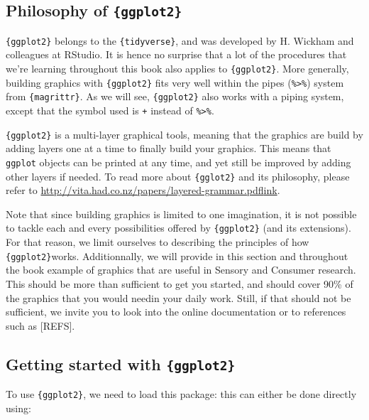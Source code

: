 \documentclass[
]{book}
\begin{document}
\hypertarget{philosophy-of-ggplot2}{%
\subsection{\texorpdfstring{Philosophy of \texttt{\{ggplot2\}}}{Philosophy of \{ggplot2\}}}\label{philosophy-of-ggplot2}}

\texttt{\{ggplot2\}} belongs to the \texttt{\{tidyverse\}}, and was developed by H. Wickham and colleagues at RStudio. It is hence no surprise that a lot of the procedures that we're learning throughout this book also applies to \texttt{\{ggplot2\}}. More generally, building graphics with \texttt{\{ggplot2\}} fits very well within the pipes (\texttt{\%\textgreater{}\%}) system from \texttt{\{magrittr\}}. As we will see, \texttt{\{ggplot2\}} also works with a piping system, except that the symbol used is \texttt{+} instead of \texttt{\%\textgreater{}\%}.

\texttt{\{ggplot2\}} is a multi-layer graphical tools, meaning that the graphics are build by adding layers one at a time to finally build your graphics. This means that \texttt{ggplot} objects can be printed at any time, and yet still be improved by adding other layers if needed. To read more about \texttt{\{gglot2\}} and its philosophy, please refer to \url{http://vita.had.co.nz/papers/layered-grammar.pdf}\href{http://vita.had.co.nz/papers/layered-grammar.pdf}{link}.

Note that since building graphics is limited to one imagination, it is not possible to tackle each and every possibilities offered by \texttt{\{ggplot2\}} (and its extensions). For that reason, we limit ourselves to describing the principles of how \texttt{\{ggplot2\}}works. Additionnally, we will provide in this section and throughout the book example of graphics that are useful in Sensory and Consumer research. This should be more than sufficient to get you started, and should cover 90\% of the graphics that you would needin your daily work. Still, if that should not be sufficient, we invite you to look into the online documentation or to references such as {[}REFS{]}.

\hypertarget{getting-started-with-ggplot2}{%
\subsection{\texorpdfstring{Getting started with \texttt{\{ggplot2\}}}{Getting started with \{ggplot2\}}}\label{getting-started-with-ggplot2}}

To use \texttt{\{ggplot2\}}, we need to load this package: this can either be done directly using:
\end{document}
